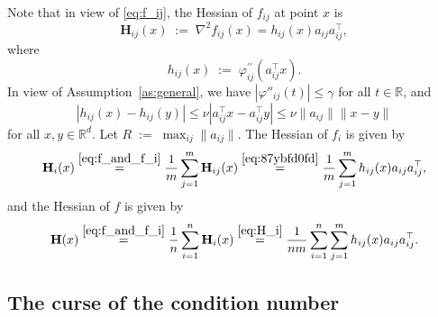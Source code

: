 \documentclass[12pt]{article}
\newcommand{\squeeze}{}
\newcommand{\eqdef}{\; { := }\;}
\newcommand{\R}{\mathbb{R}}
\newcommand{\newalpha}{h}
\newcommand{\mH}{\mathbf{H}}
\begin{document}
Note that in view of \eqref{eq:f_ij}, the Hessian of $f_{ij}$ at point $x$ is
\begin{equation}
\label{eq:87ybfd0fd}
\mH_{ij}(x) \eqdef 
\nabla^2 f_{ij}(x) = 
\newalpha_{ij}(x) a_{ij}a_{ij}^\top, 
\end{equation}
where
\begin{equation}\label{eq:h_ij-def} \newalpha_{ij}(x) \eqdef \varphi^{\prime\prime}_{ij}(a_{ij}^\top x).\end{equation} In view of Assumption~\ref{as:general}, we have $|\varphi''_{ij}(t)| \leq \gamma$ for all $t\in \R$, and 
\begin{equation}
|\newalpha_{ij}(x) - \newalpha_{ij}(y)| \leq \nu |a_{ij}^\top x - a_{ij}^\top y| \leq \nu \|a_{ij}\|  \|x-y\| \label{eq:alphaijL} 
\end{equation}
for all $x, y \in \R^d$. Let $R\eqdef \max_{ij} \|a_{ij}\|$. The Hessian of $f_i$ is given by
\begin{equation}\label{eq:H_i} \squeeze \mH_i(x) \overset{\eqref{eq:f_and_f_i}  }{=}
\frac{1}{m}\sum\limits_{j=1}^m \mH_{ij}(x) \overset{\eqref{eq:87ybfd0fd}}{=} \frac{1}{m}\sum\limits\limits_{j=1}^m \newalpha_{ij}(x) a_{ij}a_{ij}^\top,\end{equation}
and the Hessian of $f$ is given by
\begin{equation}\label{eq:H}\squeeze \mH(x) \overset{\eqref{eq:f_and_f_i}  }{=}
\frac{1}{n}\sum\limits_{i=1}^n \mH_{i}(x) \overset{\eqref{eq:H_i}}{=} \frac{1}{nm}\sum \limits_{i=1}^n   \sum\limits_{j=1}^m \newalpha_{ij}(x) a_{ij}a_{ij}^\top.\end{equation}


\subsection{The curse of the condition number}
 
\end{document}
